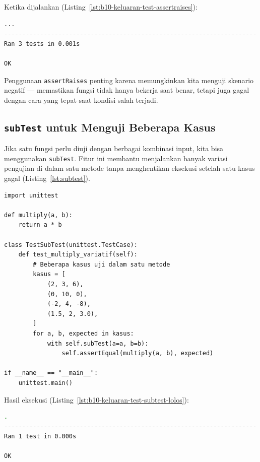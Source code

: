 Ketika dijalankan (Listing~\ref{lst:b10-keluaran-test-assertraises}):

\begin{lstlisting}[language=bash, caption={Keluaran test assertRaises}, label={lst:b10-keluaran-test-assertraises}]
...
----------------------------------------------------------------------
Ran 3 tests in 0.001s

OK
\end{lstlisting}

Penggunaan \texttt{assertRaises} penting karena memungkinkan kita menguji skenario negatif — memastikan fungsi tidak hanya bekerja saat benar, tetapi juga gagal dengan cara yang tepat saat kondisi salah terjadi.

\subsection{\texttt{subTest} untuk Menguji Beberapa Kasus}

Jika satu fungsi perlu diuji dengan berbagai kombinasi input, kita bisa menggunakan \texttt{subTest}.  
Fitur ini membantu menjalankan banyak variasi pengujian di dalam satu metode tanpa menghentikan eksekusi setelah satu kasus gagal (Listing~\ref{lst:subtest}).

\begin{lstlisting}[style=PythonStyle, caption={Penggunaan subTest untuk beberapa kasus input}, label={lst:subtest}]
import unittest

def multiply(a, b):
    return a * b

class TestSubTest(unittest.TestCase):
    def test_multiply_variatif(self):
        # Beberapa kasus uji dalam satu metode
        kasus = [
            (2, 3, 6),
            (0, 10, 0),
            (-2, 4, -8),
            (1.5, 2, 3.0),
        ]
        for a, b, expected in kasus:
            with self.subTest(a=a, b=b):
                self.assertEqual(multiply(a, b), expected)

if __name__ == "__main__":
    unittest.main()
\end{lstlisting}

Hasil eksekusi (Listing~\ref{lst:b10-keluaran-test-subtest-lolos}):

\begin{lstlisting}[language=bash, caption={Keluaran test subTest yang lolos}, label={lst:b10-keluaran-test-subtest-lolos}]
.
----------------------------------------------------------------------
Ran 1 test in 0.000s

OK
\end{lstlisting}

